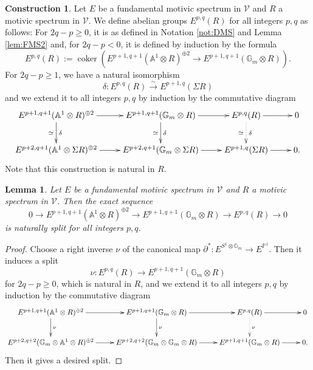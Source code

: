 \documentclass{amsart}
\theoremstyle{plain}
\newtheorem{lemma}[theorem]{Lemma}
\theoremstyle{definition}
\newtheorem{construction}[theorem]{Construction}
\theoremstyle{remark}
\numberwithin{equation}{theorem}
\newcommand{\mbb}[1]{\mathbb{#1}}
\newcommand{\V}{\mathcal{V}}
\newcommand{\coker}{\operatorname{coker}}
\begin{document}
\begin{construction}\label{cons:FSt}
Let $E$ be a fundamental motivic spectrum in $\V$ and $R$ a motivic spectrum in $\V$.
We define abelian groups $E^{p,q}(R)$ for all integers $p,q$ as follows:
For $2q-p\ge 0$, it is as defined in Notation \ref{not:DMS} and Lemma \ref{lem:FMS2} and, for $2q-p<0$, it is defined by induction by the formula
\[
	E^{p,q}(R) := \coker(E^{p+1,q+1}(\mbb{A}^1\otimes R)^{\oplus 2} \to E^{p+1,q+1}(\mbb{G}_m\otimes R)).
\]
For $2q-p\ge 1$, we have a natural isomorphism
\[
	\delta \colon E^{p,q}(R) \xrightarrow{\sim} E^{p+1,q}(\Sigma R)
\]
and we extend it to all integers $p,q$ by induction by the commutative diagram
\[
\xymatrix{
	E^{p+1,q+1}(\mbb{A}^1\otimes R)^{\oplus 2} \ar[r] \ar[d]^\delta_\simeq &
		E^{p+1,q+1}(\mbb{G}_m\otimes R) \ar[r] \ar[d]^\delta_\simeq & E^{p,q}(R) \ar[r] \ar@{.>}[d]^\delta_\simeq & 0 \\
	E^{p+2,q+1}(\mbb{A}^1\otimes\Sigma R)^{\oplus 2} \ar[r] &
		E^{p+2,q+1}(\mbb{G}_m\otimes\Sigma R) \ar[r] & E^{p+1,q}(\Sigma R) \ar[r] & 0.
}
\]
Note that this construction is natural in $R$.
\end{construction}

\begin{lemma}\label{lem:FSt}
Let $E$ be a fundamental motivic spectrum in $\V$ and $R$ a motivic spectrum in $\V$.
Then the exact sequence
\[
	0 \to E^{p+1,q+1}(\mbb{A}^1\otimes R)^{\oplus 2} \to E^{p+1,q+1}(\mbb{G}_m\otimes R) \to E^{p,q}(R) \to 0
\]
is naturally split for all integers $p,q$.
\end{lemma}
\begin{proof}
Choose a right inverse $\nu$ of the canonical map $\partial^*\colon E^{S^1\otimes\mbb{G}_m}\to E^{\mbb{P}^1}$.
Then it induces a split
\[
	\nu \colon E^{p,q}(R) \to E^{p+1,q+1}(\mbb{G}_m\otimes R)
\]
for $2q-p\ge 0$, which is natural in $R$, and we extend it to all integers $p,q$ by induction by the commutative diagram
\[
\xymatrix{
	E^{p+1,q+1}(\mbb{A}^1\otimes R)^{\oplus 2} \ar[r] \ar[d]^\nu &
		E^{p+1,q+1}(\mbb{G}_m\otimes R) \ar[r] \ar[d]^\nu & E^{p,q}(R) \ar[r] \ar@{.>}[d]^\nu & 0 \\
	E^{p+2,q+2}(\mbb{G}_m\otimes\mbb{A}^1\otimes R)^{\oplus 2} \ar[r] &
		E^{p+2,q+2}(\mbb{G}_m\otimes\mbb{G}_m\otimes R) \ar[r] & E^{p+1,q+1}(\mbb{G}_m\otimes R) \ar[r] & 0.
}
\]
Then it gives a desired split.
\end{proof}
\end{document}
